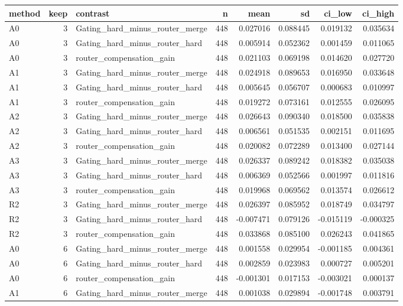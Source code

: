 \begin{tabular}{lrlrrrrr}
\toprule
method & keep & contrast & n & mean & sd & ci_low & ci_high \\
\midrule
A0 & 3 & Gating_hard_minus_router_merge & 448 & 0.027016 & 0.088445 & 0.019132 & 0.035634 \\
A0 & 3 & Gating_hard_minus_router_hard & 448 & 0.005914 & 0.052362 & 0.001459 & 0.011065 \\
A0 & 3 & router_compensation_gain & 448 & 0.021103 & 0.069198 & 0.014620 & 0.027720 \\
A1 & 3 & Gating_hard_minus_router_merge & 448 & 0.024918 & 0.089653 & 0.016950 & 0.033648 \\
A1 & 3 & Gating_hard_minus_router_hard & 448 & 0.005645 & 0.056707 & 0.000683 & 0.010997 \\
A1 & 3 & router_compensation_gain & 448 & 0.019272 & 0.073161 & 0.012555 & 0.026095 \\
A2 & 3 & Gating_hard_minus_router_merge & 448 & 0.026643 & 0.090340 & 0.018500 & 0.035838 \\
A2 & 3 & Gating_hard_minus_router_hard & 448 & 0.006561 & 0.051535 & 0.002151 & 0.011695 \\
A2 & 3 & router_compensation_gain & 448 & 0.020082 & 0.072289 & 0.013400 & 0.027144 \\
A3 & 3 & Gating_hard_minus_router_merge & 448 & 0.026337 & 0.089242 & 0.018382 & 0.035038 \\
A3 & 3 & Gating_hard_minus_router_hard & 448 & 0.006369 & 0.052566 & 0.001997 & 0.011816 \\
A3 & 3 & router_compensation_gain & 448 & 0.019968 & 0.069562 & 0.013574 & 0.026612 \\
R2 & 3 & Gating_hard_minus_router_merge & 448 & 0.026397 & 0.085952 & 0.018749 & 0.034797 \\
R2 & 3 & Gating_hard_minus_router_hard & 448 & -0.007471 & 0.079126 & -0.015119 & -0.000325 \\
R2 & 3 & router_compensation_gain & 448 & 0.033868 & 0.085100 & 0.026243 & 0.041865 \\
A0 & 6 & Gating_hard_minus_router_merge & 448 & 0.001558 & 0.029954 & -0.001185 & 0.004361 \\
A0 & 6 & Gating_hard_minus_router_hard & 448 & 0.002859 & 0.023983 & 0.000727 & 0.005201 \\
A0 & 6 & router_compensation_gain & 448 & -0.001301 & 0.017153 & -0.003021 & 0.000137 \\
A1 & 6 & Gating_hard_minus_router_merge & 448 & 0.001038 & 0.029894 & -0.001748 & 0.003791 \\

\end{tabular}
